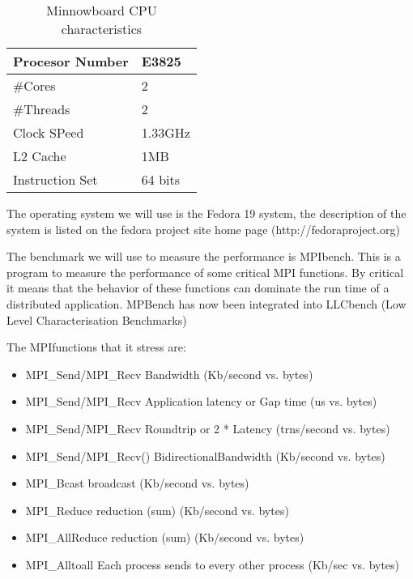 \documentclass[a4paper]{article}
\begin{document}
\begin{table}[h]
    \centering \begin{tabular}{|l|l|} 
        \hline Procesor Number &E3825   \\ 
        \hline \#Cores         & 2       \\ 
        \hline \#Threads       & 2\\ 
        \hline Clock SPeed     & 1.33GHz \\ 
        \hline L2 Cache        & 1MB     \\
        \hline Instruction Set & 64 bits \\ 
        \hline \end{tabular} 
        \caption{Minnowboard CPU characteristics } 
    \label{table:table1} 
\end{table}

The operating system we will use is the Fedora 19 system, the description of the
system is listed on the fedora project site home page (http://fedoraproject.org)

The benchmark we will use to measure the performance is MPIbench. This is a
program to measure the performance of some critical MPI functions. By critical
it means that the behavior of these functions can dominate the run time of a
distributed application. MPBench has now been integrated into LLCbench (Low
Level Characterisation Benchmarks) 

The MPIfunctions that it stress are: 


\begin{itemize}

\item MPI\_Send/MPI\_Recv Bandwidth (Kb/second vs. bytes) 
\item MPI\_Send/MPI\_Recv Application latency or Gap time (us vs. bytes)
\item MPI\_Send/MPI\_Recv Roundtrip or 2 * Latency (trns/second vs. bytes) 
\item MPI\_Send/MPI\_Recv() BidirectionalBandwidth (Kb/second vs. bytes) 
\item MPI\_Bcast broadcast (Kb/second vs. bytes) 
\item MPI\_Reduce reduction (sum) (Kb/second vs. bytes) 
\item MPI\_AllReduce reduction (sum) (Kb/second vs. bytes) 
\item MPI\_Alltoall Each process sends to every other process (Kb/sec vs. bytes) 

\end{itemize}
\end{document}
